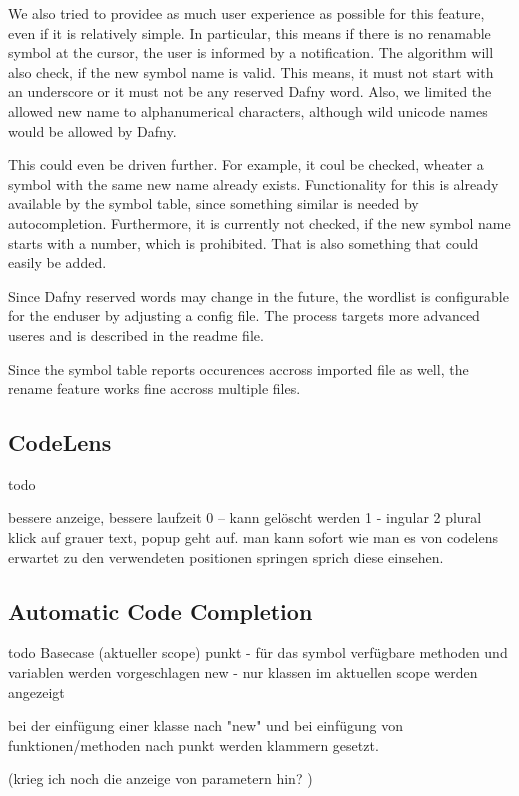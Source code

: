 We also tried to providee as much user experience as possible for this feature, even if it is relatively simple.
In particular, this means if there is no renamable symbol at the cursor, the user is informed by a notification.
The algorithm will also check, if the new symbol name is valid.
This means, it must not start with an underscore or it must not be any reserved Dafny word.
Also, we limited the allowed new name to alphanumerical characters, although wild unicode names would be allowed by Dafny.

This could even be driven further. For example, it coul be checked, wheater a symbol with the same new name already exists.
Functionality for this is already available by the symbol table, since something similar is needed by autocompletion.
Furthermore, it is currently not checked, if the new symbol name starts with a number, which is prohibited.
That is also something that could easily be added. 

Since Dafny reserved words may change in the future, the wordlist is configurable for the enduser by adjusting a config file.
The process targets more advanced useres and is described in the readme file.

Since the symbol table reports occurences accross imported file as well, the rename feature works fine accross multiple files.



\subsection{CodeLens}
todo

bessere anzeige, bessere laufzeit
0 -- kann gelöscht werden
1 - ingular
2 plural
 klick auf grauer text, popup geht auf. man kann sofort wie man es von codelens erwartet zu den verwendeten positionen springen sprich diese einsehen.

\subsection{Automatic Code Completion}
todo
Basecase (aktueller scope)
punkt - für das symbol verfügbare methoden und variablen werden vorgeschlagen
new - nur klassen im aktuellen scope werden angezeigt

bei der einfügung einer klasse nach "new" und bei einfügung von funktionen/methoden nach punkt werden klammern gesetzt.

(krieg ich noch die anzeige von parametern hin? )

